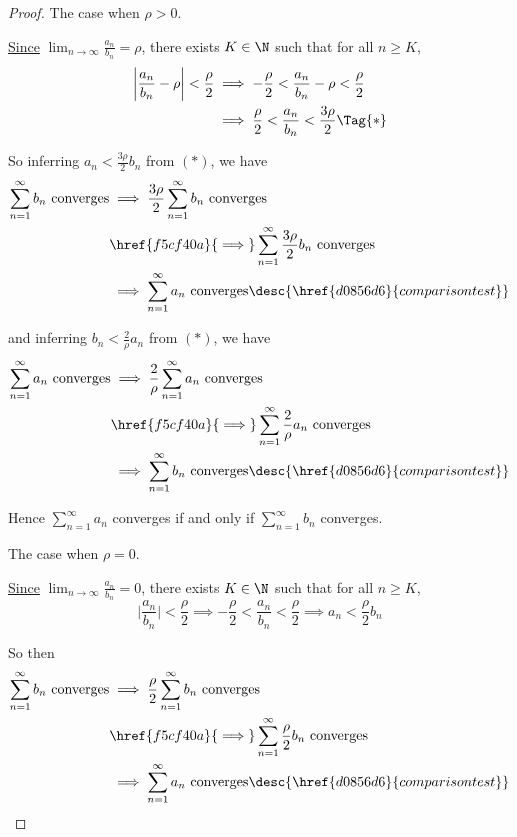 \begin{proof}
   The case when $\rho>0$.

  \href{e565120}{Since} $\displaystyle\lim_{n\to\infty}\frac{a_n}{b_n}=\rho$,
  there exists $K\in\N$ such that for all $n\geq K$,
  \begin{align*}
    \biggl|\frac{a_n}{b_n}-\rho\biggr|<\frac\rho2
     &\implies-\frac\rho2<\frac{a_n}{b_n}-\rho<\frac\rho2     \\
     &\implies\frac\rho2<\frac{a_n}{b_n}<\frac{3\rho}2\Tag{*}
  \end{align*}

  So inferring $a_n<\frac{3\rho}2b_n$ from $(*)$, we have
  \begin{align*}
    \sum_{n=1}^\infty b_n\text{ converges}
     &\implies\frac{3\rho}2\sum_{n=1}^\infty b_n\text{ converges}                          \\
     &\href{f5cf40a}{\implies}\sum_{n=1}^\infty\frac{3\rho}2b_n\text{ converges}           \\
     &\implies\sum_{n=1}^\infty a_n\text{ converges}\desc{\href{d0856d6}{comparison test}}
  \end{align*}

  and inferring $b_n<\frac2\rho a_n$ from $(*)$, we have
  \begin{align*}
    \sum_{n=1}^\infty a_n\text{ converges}
     &\implies\frac2\rho\sum_{n=1}^\infty a_n\text{ converges}                             \\
     &\href{f5cf40a}{\implies}\sum_{n=1}^\infty\frac2\rho a_n\text{ converges}             \\
     &\implies\sum_{n=1}^\infty b_n\text{ converges}\desc{\href{d0856d6}{comparison test}}
  \end{align*}

  Hence $\sum_{n=1}^\infty a_n$ converges if and only if $\sum_{n=1}^\infty
  b_n$ converges.

   The case when $\rho=0$.

  \href{e565120}{Since} $\displaystyle\lim_{n\to\infty}\frac{a_n}{b_n}=0$, there
  exists $K\in\N$ such that for all $n\geq K$,
  $$
    \biggl|\frac{a_n}{b_n}\biggr|<\frac\rho2
    \implies-\frac\rho2<\frac{a_n}{b_n}<\frac\rho2
    \implies a_n<\frac\rho2b_n
  $$

  So then
  \begin{align*}
    \sum_{n=1}^\infty b_n\text{ converges}
     &\implies\frac\rho2\sum_{n=1}^\infty b_n\text{ converges}                             \\
     &\href{f5cf40a}{\implies}\sum_{n=1}^\infty\frac\rho2b_n\text{ converges}              \\
     &\implies\sum_{n=1}^\infty a_n\text{ converges}\desc{\href{d0856d6}{comparison test}}
  \end{align*}
\end{proof}

